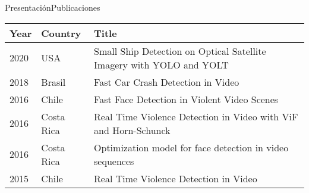 \documentclass[10pt]{beamer}
\newcommand{\1}{
	\setbeamertemplate{background}{
		\texttt{[image: img/1]}
		\tikz[overlay] \fill[fill opacity=0.75,fill=white] (0,0) rectangle (-\paperwidth,\paperheight);
	}
}
\begin{document}
\begin{frame}{Presentación}{Publicaciones}
	\begin{table}[]
		\setlength{\tabcolsep}{0.5em} %
		{\renewcommand{\arraystretch}{1.4}%
			\begin{tabular}{llp{7cm}}
				\textbf{Year} & \textbf{Country} & \textbf{Title}                                                                                                              \\
				\hline
				2020          & USA              & Small Ship Detection on Optical Satellite Imagery with YOLO and YOLT                                                        \\
				2018          & Brasil           & Fast Car Crash Detection in Video                                                                                           \\
				2016          & Chile            & Fast Face Detection in Violent Video Scenes                                                                                 \\
				2016          & Costa Rica       & Real Time Violence Detection in Video with ViF and Horn-Schunck                                                             \\
				2016          & Costa Rica       & Optimization model for face detection in video sequences                                                                    \\
				2015          & Chile            & Real Time Violence Detection in Video                                                                                      
			\end{tabular}
		}
	\end{table}
\end{frame}
\end{document}
